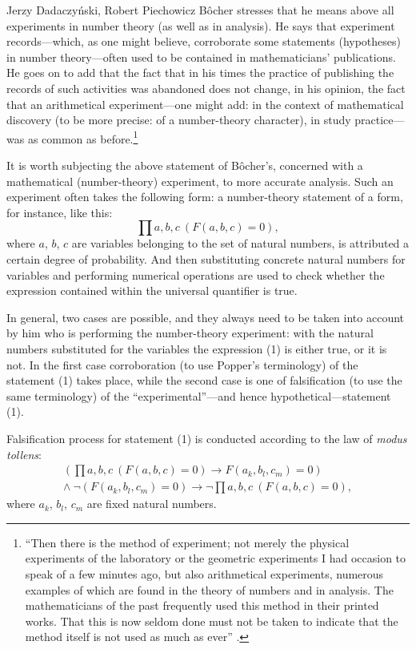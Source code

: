 \begin{artengenv}{Jerzy Dadaczyński, Robert Piechowicz}
Bôcher stresses that he means above all experiments in number theory (as well as in analysis). He says that experiment records---which, as one might believe, corroborate some statements (hypotheses) in number theory---often used to be contained in mathematicians' publications. He goes on to add that the fact that in his times the practice of publishing the records of such activities was abandoned does not change, in his opinion, the fact that an arithmetical experiment---one might add: in the context of mathematical discovery (to be more precise: of a number-theory character), in study practice---was as common as before.\footnote{``Then there is the method of experiment; not merely the physical experiments of the laboratory or the geometric experiments I had occasion to speak of a few minutes ago, but also arithmetical experiments, numerous examples of which are found in the theory of numbers and in analysis. The mathematicians of the past frequently used this method in their printed works. That this is now seldom done must not be taken to indicate that the method itself is not used as much as ever''
\parencite[][p.134]{bocher_fundamental_1904}.%
}

It is worth subjecting the above statement of Bôcher's, concerned with a mathematical (number-theory) experiment, to more accurate analysis. Such an experiment often takes the following form: a number-theory statement of a form, for instance, like this:
\begin{equation}
\prod a,b,c\ (F(a,b,c) = 0),
\end{equation}
where $a$, $b$, $c$ are variables belonging to the set of natural numbers, is attributed a certain degree of probability. And then substituting concrete natural numbers for variables and performing numerical operations are used to check whether the expression contained within the universal quantifier is true.

In general, two cases are possible, and they always need to be taken into account by him who is performing the number-theory experiment: with the natural numbers substituted for the variables the expression (1) is either true, or it is not. In the first case corroboration (to use Popper's terminology) of the statement (1) takes place, while the second case is one of falsification (to use the same terminology) of the ``experimental''---and hence hypothetical---statement (1).

Falsification process for statement (1) is conducted according to the law of \textit{modus tollens}:
\begin{equation}
\begin{split}
(\prod a,b,c\ (F(a,b,c) = 0) \to F(a_{k}, b_{l}, c_{m}) = 0)\\
\land\ \neg (F(a_{k}, b_{l}, c_{m}) = 0)
\to \neg \prod a,b,c\ (F(a,b,c) = 0),
\end{split}
\end{equation}
where $a_{k}$, $b_{l}$, $c_{m}$ are fixed natural numbers.


\end{artengenv}
